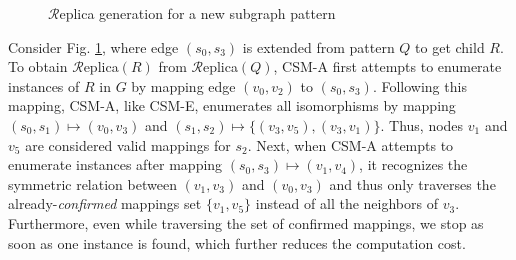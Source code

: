 \begin{figure}
	\caption{$\mathcal{R}$eplica generation for a new subgraph pattern}
	\label{fig:approxex}
	 \vspace{-0.05in}
\end{figure}
\vspace{-0.05in}
\begin{exple}
	Consider Fig. \ref{fig:approxex}, where edge $(s_0,s_3)$ is
	extended from pattern $Q$ to get child $R$. To obtain
	$\mathcal{R}$eplica$(R)$ from $\mathcal{R}$eplica$(Q)$, \textsc{CSM-A} first
	attempts to enumerate instances of $R$ in $G$ by mapping edge $(v_0, v_2)$ to $(s_0,s_3)$. Following this mapping, CSM-A, like CSM-E,
	enumerates all isomorphisms by mapping
	$(s_0,s_1)\mapsto(v_0,v_3)$ and $(s_1,s_2)\mapsto
	\{(v_3,v_5),(v_3,v_1)\}$. Thus, nodes
	$v_1$ and $v_5$ are considered valid mappings for $s_2$. Next, when
	\textsc{CSM-A} attempts to enumerate instances after mapping
	$(s_0,s_3)\mapsto(v_1, v_4)$, it recognizes the symmetric relation between
	$(v_1,v_3)$ and $(v_0,v_3)$ and thus only traverses the
	already-\emph{confirmed} mappings set $\{v_1,v_5\}$ instead of all the neighbors of $v_3$. Furthermore, even while traversing the set of confirmed mappings, we stop as soon as one instance is found, which further reduces the computation cost.  %

	
	\label{ex:approx}
	\end{exple}
